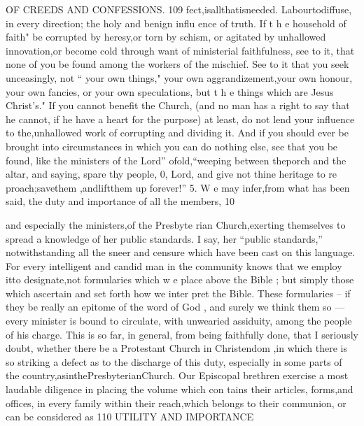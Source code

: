 \documentclass[
]{book}
\begin{document}
OF CREEDS AND CONFESSIONS. 109
fect,isallthatisneeded. Labourtodiffuse, in every direction; the holy and benign influ ence of truth. If t h e household of faith"
be corrupted by heresy,or torn by schism, or agitated by unhallowed innovation,or become
cold through want of ministerial faithfulness,
see to it, that none of you be found among the workers of the mischief. See to it that
you seek unceasingly, not `` your own things," your own aggrandizement,your own honour,
your own fancies, or your own speculations, but t h e things which are Jesus Christ's." If you cannot benefit the Church, (and no man has a right to say that he cannot, if he have a heart for the purpose) at least, do
not lend your influence to the,unhallowed
work of corrupting and dividing it. And if
you should ever be brought into circumstances
in which you can do nothing else, see that you be found, like the ministers of the
Lord'' ofold,``weeping between theporch and the altar, and saying, spare thy people,
0, Lord, and give not thine heritage to re proach;savethem ,andliftthem up forever!''
5. W e may infer,from what has been said,
the duty and importance of all the members, 10

and especially the ministers,of the Presbyte
rian Church,exerting themselves to spread a knowledge of her public standards. I say,
her ``public standards,'' notwithstanding all the sneer and censure which have been cast
on this language. For every intelligent and
candid man in the community knows that we
employ itto designate,not formularies which
w e place above the Bible ; but simply those which ascertain and set forth how we inter
pret the Bible. These formularies -- if they
be really an epitome of the word of God , and
surely we think them so --- every minister is bound to circulate, with unwearied assiduity, among the people of his charge. This is so
far, in general, from being faithfully done,
that I seriously doubt, whether there be a
Protestant Church in Christendom ,in which
there is so striking a defect as to the discharge
of this duty, especially in some parts of the
country,asinthePresbyterianChurch. Our
Episcopal brethren exercise a most laudable
diligence in placing the volume which con tains their articles, forms,and offices, in every
family within their reach,which belongs to their communion, or can be considered as
110 UTILITY AND IMPORTANCE
\end{document}

